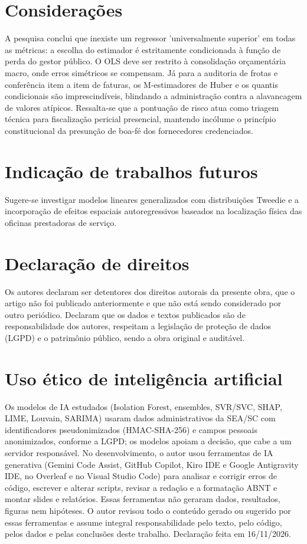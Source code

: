 \documentclass[12pt,a4paper]{article}
\begin{document}
\section{Considerações}

A pesquisa conclui que inexiste um regressor 'universalmente superior' em todas as métricas: a escolha do estimador é estritamente condicionada à função de perda do gestor público. O OLS deve ser restrito à consolidação orçamentária macro, onde erros simétricos se compensam. Já para a auditoria de frotas e conferência item a item de faturas, os M-estimadores de Huber e os quantis condicionais são imprescindíveis, blindando a administração contra a alavancagem de valores atípicos. Ressalta-se que a pontuação de risco atua como triagem técnica para fiscalização pericial presencial, mantendo incólume o princípio constitucional da presunção de boa-fé dos fornecedores credenciados.


\section{Indicação de trabalhos futuros}

Sugere-se investigar modelos lineares generalizados com distribuições Tweedie e a incorporação de efeitos espaciais autoregressivos baseados na localização física das oficinas prestadoras de serviço.


\section{Declaração de direitos}

Os autores declaram ser detentores dos direitos autorais da presente obra, que o artigo não foi publicado anteriormente e que não está sendo considerado por outro periódico. Declaram que os dados e textos publicados são de responsabilidade dos autores, respeitam a legislação de proteção de dados (LGPD) e o patrimônio público, sendo a obra original e auditável.


\section*{Uso ético de inteligência artificial}
Os modelos de IA estudados (Isolation Forest, ensembles, SVR/SVC, SHAP, LIME, Louvain, SARIMA) usaram dados administrativos da SEA/SC com identificadores pseudonimizados (HMAC-SHA-256) e campos pessoais anonimizados, conforme a LGPD; os modelos apoiam a decisão, que cabe a um servidor responsável. No desenvolvimento, o autor usou ferramentas de IA generativa (Gemini Code Assist, GitHub Copilot, Kiro IDE e Google Antigravity IDE, no Overleaf e no Visual Studio Code) para analisar e corrigir erros de código, escrever e alterar scripts, revisar a redação e a formatação ABNT e montar slides e relatórios. Essas ferramentas não geraram dados, resultados, figuras nem hipóteses. O autor revisou todo o conteúdo gerado ou sugerido por essas ferramentas e assume integral responsabilidade pelo texto, pelo código, pelos dados e pelas conclusões deste trabalho. Declaração feita em 16/11/2026.
\end{document}
